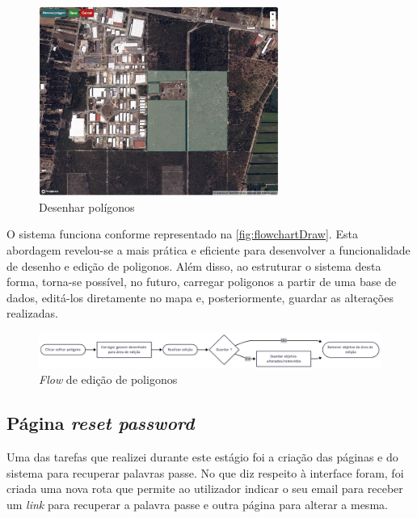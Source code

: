 \begin{figure}[h!]
    \centering
    \includegraphics[width=0.7\textwidth]{figs/draw.png}
    \caption{Desenhar polígonos}
    \label{fig:drawPoly}
\end{figure}


O sistema funciona conforme representado na \autoref{fig:flowchartDraw}. Esta abordagem revelou-se a mais prática e eficiente para desenvolver a funcionalidade de desenho e edição de poligonos. Além disso, ao estruturar o sistema desta forma, torna-se possível, no futuro, carregar poligonos a partir de uma base de dados, editá-los diretamente no mapa e, posteriormente, guardar as alterações realizadas.

\begin{figure}[h!]
    \centering
    \includegraphics[width=\textwidth]{figs/flowchart_draw.png}
    \caption{\textit{Flow} de edição de poligonos}
    \label{fig:flowchartDraw}
\end{figure}

\clearpage
\subsection{Página \textit{reset password}}\label{sec:resetPassword}
Uma das tarefas que realizei durante este estágio foi a criação das páginas e do sistema para recuperar palavras passe. No que diz respeito à interface foram, foi criada uma nova rota que permite ao utilizador indicar o seu email para receber um \textit{link} para recuperar a palavra passe e outra página para alterar a mesma. 


